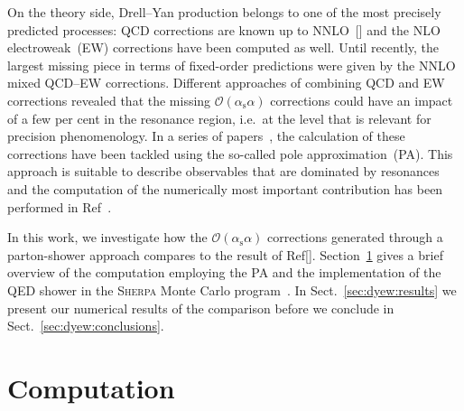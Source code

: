 \documentclass[11pt]{cernrep}
\newcommand{\order}{\ensuremath{\mathcal{O}}}
\newcommand{\alphas}{\ensuremath{\alpha_\mathrm{s}}}
\begin{document}
On the theory side, Drell--Yan production belongs to one of the most precisely predicted processes:
QCD corrections are known up to NNLO~[] and the NLO electroweak~(EW) corrections have been computed as well.
Until recently, the largest missing piece in terms of fixed-order predictions were given by the NNLO mixed QCD--EW corrections.
Different approaches of combining QCD and EW corrections revealed that the missing $\order(\alphas\alpha)$ corrections could have an impact of a few per cent in the resonance region, i.e.\ at the level that is relevant for precision phenomenology.
In a series of papers~\cite{Dittmaier:2014qza,Dittmaier:2015rxo}, the calculation of these corrections have been tackled using the so-called pole approximation~(PA).
This approach is suitable to describe observables that are dominated by resonances
and the computation of the numerically most important contribution has been performed in Ref~\cite{Dittmaier:2015rxo}.

In this work, we investigate how the $\order(\alphas\alpha)$ corrections generated through a parton-shower approach compares to the result of Ref[].
Section~\ref{sec:dyew:comp} gives a brief overview of the computation employing the PA and the implementation of the QED shower in the \textsc{Sherpa} Monte Carlo program~\cite{Gleisberg:2008ta}.
In Sect.~\ref{sec:dyew:results} we present our numerical results of the comparison before we conclude in Sect.~\ref{sec:dyew:conclusions}.


\section{Computation}
\label{sec:dyew:comp}

\end{document}

